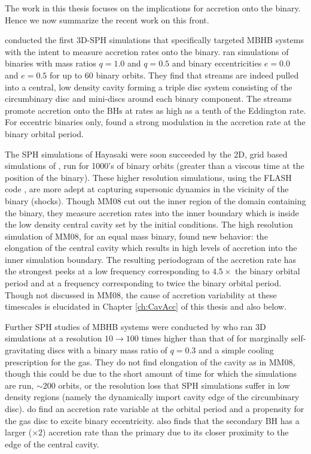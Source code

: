 The work in this thesis focuses on the implications for accretion onto the binary. Hence we now summarize the recent work on this front.


\cite{Hayasaki:2007} conducted the first 3D-SPH simulations that specifically
targeted MBHB systems with the intent to measure accretion rates onto the
binary. \cite{Hayasaki:2007} ran simulations of binaries with mass ratios
$q=1.0$ and $q=0.5$ and binary eccentricities $e=0.0$ and $e=0.5$ for up to 60
binary orbits. They find that streams are indeed pulled into a central, low
density cavity forming a triple disc system \citep{Hayasaki+2008} consisting of
the circumbinary disc and mini-discs around each binary component. The streams
promote accretion onto the BHs at rates as high as a tenth of the Eddington
rate. For eccentric binaries only, \cite{Hayasaki:2007} found a strong modulation in
the accretion rate at the binary orbital period. 

The SPH simulations of Hayasaki were soon succeeded by the 2D, grid based 
simulations of \citep[][hereafter MM08]{MacFadyen:2008},  run for 1000's of binary orbits (greater than a
viscous time at the position of the binary). These higher resolution
simulations, using the FLASH code \citep{Fryxell:2000}, are more adept at
capturing supersonic dynamics in the vicinity of the binary (shocks). Though
MM08 cut out the inner region of the domain containing the binary, they
measure accretion rates into the inner boundary which is inside the low
density central cavity set by the initial conditions. The high resolution
simulation of MM08, for an equal mass binary, found new behavior: the
elongation of the central cavity which results in high levels of accretion
into the inner simulation boundary. The resulting periodogram of the
accretion rate has the strongest peeks at a low frequency corresponding to
$4.5 \times$ the binary orbital period and at a frequency corresponding to
twice the binary orbital period. Though not discussed in MM08, the cause of
accretion variability at these timescales is elucidated in Chapter
\ref{ch:CavAcc} of this thesis and also \cite{ShiKrolik:2012} below.


Further SPH studies of MBHB systems were conducted by \cite{Cuadra:2009} who
ran 3D simulations at a resolution $10 \rightarrow 100$ times higher than that of
\cite{Hayasaki:2007} for marginally self-gravitating discs with a binary mass
ratio of $q=0.3$ and a simple cooling prescription for the gas. They do not
find elongation of the cavity as in MM08, though this could be due to the
short amount of time for which the simulations are run, $\sim 200$ orbits, or
the resolution loss that SPH simulations suffer in low density regions (namely
the dynamically import cavity edge of the circumbinary disc).
\cite{Cuadra:2009} do find an accretion rate variable at the orbital period
and a propensity for the gas disc to excite binary eccentricity.
\cite{Cuadra:2009} also finds that the secondary BH has a larger ($\times 2$)
accretion rate than the primary due to its closer proximity to the edge of
the central cavity.


